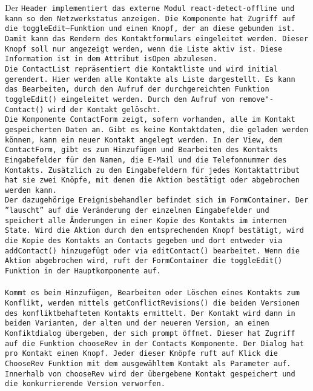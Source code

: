 %
Der \tt{Header} implementiert das externe Modul \tt{react-detect-offline} und kann so den Netzwerkstatus anzeigen. Die Komponente hat Zugriff auf die \tt{toggleEdit}--Funktion und einen Knopf, der an diese gebunden ist. Damit kann das Rendern des Kontaktformulars eingeleitet werden.
Dieser Knopf soll nur angezeigt werden, wenn die Liste aktiv ist. Diese Information ist in dem Attribut \tt{isOpen} abzulesen.\\
Die \tt{ContactList} repräsentiert die Kontaktliste und wird initial gerendert. Hier werden alle Kontakte als Liste dargestellt.
Es kann das Bearbeiten, durch den Aufruf der durchgereichten Funktion \tt{toggleEdit()} eingeleitet werden. Durch den Aufruf von \tt{remove"-Contact()} wird der Kontakt gelöscht.\\
%
Die Komponente \tt{ContactForm} zeigt, sofern vorhanden, alle im Kontakt gespeicherten Daten an.
Gibt es keine Kontaktdaten, die geladen werden können, kann ein neuer Kontakt angelegt werden.
In der View, dem \tt{ContactForm}, gibt es zum Hinzufügen und Bearbeiten des Kontakts Eingabefelder für den Namen, die E-Mail und die Telefonnummer des Kontakts.
Zusätzlich zu den Eingabefeldern für jedes Kontaktattribut hat sie zwei Knöpfe, mit denen die Aktion bestätigt oder abgebrochen werden kann.\\
Der dazugehörige Ereignisbehandler befindet sich im \tt{FormContainer}. 
Der ''lauscht'' auf die Veränderung der einzelnen Eingabefelder und speichert alle Änderungen in einer Kopie des Kontakts im internen State.
Wird die Aktion durch den entsprechenden Knopf bestätigt, wird die Kopie des Kontakts an \tt{Contacts} gegeben und dort entweder via \tt{addContact()} hinzugefügt oder via \tt{editContact()} bearbeitet.
Wenn die Aktion abgebrochen wird, ruft der \tt{FormContainer} die \tt{toggleEdit()} Funktion in der Hauptkomponente auf.\\\\
%
%
Kommt es beim Hinzufügen, Bearbeiten oder Löschen eines Kontakts zum Konflikt, werden mittels \tt{getConflictRevisions()} die beiden Versionen des konfliktbehafteten Kontakts ermittelt.
Der Kontakt wird dann in beiden Varianten, der alten und der neueren Version, an einen Konfiktdialog übergeben, der sich prompt öffnet. Dieser hat Zugriff auf die Funktion \tt{chooseRev} in der \tt{Contacts} Komponente. Der Dialog hat pro Kontakt einen Knopf. Jeder dieser Knöpfe ruft auf Klick die \tt{ChooseRev} Funktion mit dem ausgewähltem Kontakt als Parameter auf.
Innerhalb von \tt{chooseRev} wird der übergebene Kontakt gespeichert und die konkurrierende Version verworfen.\\\\
